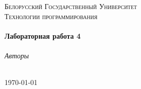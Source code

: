 \begin{titlepage}
  \begin{center}

    \textsc{\LARGE Белорусский Государственный Университет}\\[1.5cm]
    \textsc{\Large Технологии программирования}\\[0.5cm]

    \HRule\\[0.4cm]
    {\huge \bfseries Лабораторная работа 4\\[0.4cm]}
    \HRule\\[1.5cm]

    \emph{Авторы}\\[0.1cm]
    \noindent{}\\[1cm]

    \vfill

    {\large \today}

  \end{center}
\end{titlepage}
